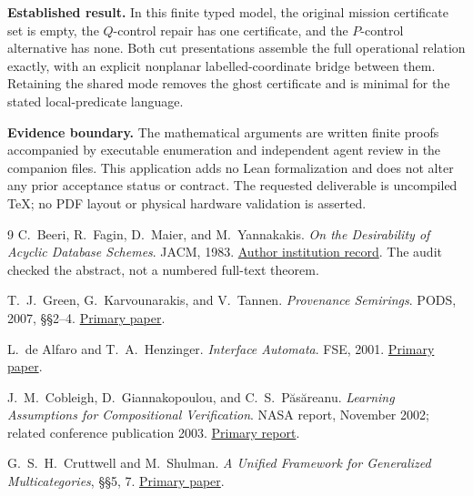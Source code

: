 \documentclass[11pt]{article}
\begin{document}
\textbf{Established result.} In this finite typed model, the original mission
certificate set is empty, the $Q$-control repair has one certificate, and the
$P$-control alternative has none. Both cut presentations assemble the full
operational relation exactly, with an explicit nonplanar labelled-coordinate
bridge between them. Retaining the shared mode removes the ghost certificate
and is minimal for the stated local-predicate language.

\textbf{Evidence boundary.} The mathematical arguments are written finite
proofs accompanied by executable enumeration and independent agent review in
the companion files. This application adds no Lean formalization and does not
alter any prior acceptance status or contract. The requested deliverable is
uncompiled TeX; no PDF layout or physical hardware validation is asserted.

\begin{thebibliography}{9}
C.~Beeri, R.~Fagin, D.~Maier, and M.~Yannakakis.
\emph{On the Desirability of Acyclic Database Schemes}. JACM, 1983.
\href{https://research.ibm.com/publications/on-the-desirability-of-acyclic-database-schemes}{Author institution record}.
The audit checked the abstract, not a numbered full-text theorem.

T.~J.~Green, G.~Karvounarakis, and V.~Tannen.
\emph{Provenance Semirings}. PODS, 2007, \S\S2--4.
\href{https://www.cs.ucdavis.edu/~green/papers/pods07.pdf}{Primary paper}.

L.~de Alfaro and T.~A.~Henzinger.
\emph{Interface Automata}. FSE, 2001.
\href{https://web.cs.wpi.edu/~heineman/html/teaching_/CS562/p109-de_alfaro.pdf}{Primary paper}.

J.~M.~Cobleigh, D.~Giannakopoulou, and C.~S.~P\u{a}s\u{a}reanu.
\emph{Learning Assumptions for Compositional Verification}.
NASA report, November 2002; related conference publication 2003.
\href{https://ntrs.nasa.gov/api/citations/20030017771/downloads/20030017771.pdf}{Primary report}.

G.~S.~H.~Cruttwell and M.~Shulman.
\emph{A Unified Framework for Generalized Multicategories}, \S\S5, 7.
\href{https://arxiv.org/pdf/0907.2460v3}{Primary paper}.
\end{thebibliography}
\end{document}
